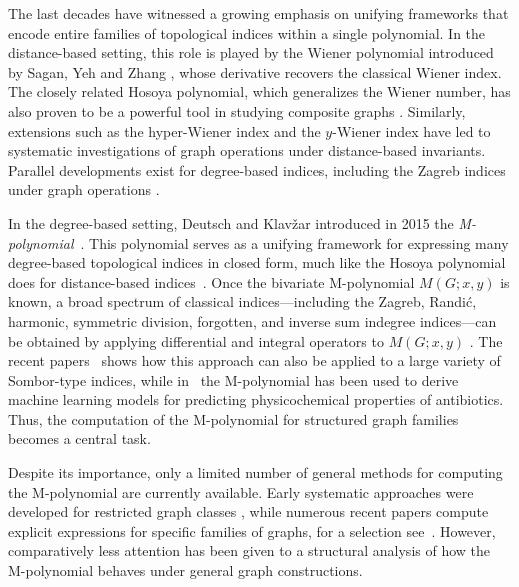 \documentclass[letterpaper,12pt]{article}
\begin{document}
The last decades have witnessed a growing emphasis on unifying frameworks that
encode entire families of topological indices within a single polynomial.
In the distance-based setting, this role is played by the Wiener polynomial
introduced by Sagan, Yeh and Zhang \cite{SaganWienerpolynomial1996},
whose derivative recovers the classical Wiener index.
The closely related Hosoya polynomial, which generalizes the Wiener number,
has also proven to be a powerful tool in studying composite graphs
\cite{STEVANOVIC2001237}.
Similarly, extensions such as the hyper-Wiener index
\cite{KHALIFEH20081402} and the $y$-Wiener index
\cite{HAMZEH20111099} have led to systematic investigations of
graph operations under distance-based invariants.
Parallel developments exist for degree-based indices,
including the Zagreb indices under graph operations
\cite{KHALIFEH2009804}. 

In the degree-based setting, Deutsch and Klavžar introduced in 2015 the
\emph{M-polynomial}~\cite{EmericMploy}. 
This polynomial serves as a unifying framework for expressing many
degree-based topological indices in closed form, much like the Hosoya
polynomial does for distance-based indices~\cite{deutsch2019m}.
Once the bivariate M-polynomial $M(G;x,y)$ is known, a broad spectrum of classical indices---including
the Zagreb, Randi\'{c}, harmonic, symmetric division, forgotten, and inverse sum
indegree indices---can be obtained by applying differential and integral
operators to $M(G;x,y)$ \cite{EmericMploy}. The recent papers~\cite{das2025closed, kumar2025novel} shows how this approach can also be applied to a large variety of Sombor-type indices, while in~\cite{li-2025} the M-polynomial has been used to derive machine learning models for predicting physicochemical properties of antibiotics. Thus, the computation of the M-polynomial for structured graph families becomes a central task.

Despite its importance, only a limited number of general methods for
computing the M-polynomial are currently available.
Early systematic approaches were developed for restricted graph classes
\cite{deutsch2019m,deutsch2023compute},
while numerous recent papers compute explicit expressions for specific
families of graphs, for a selection see~\cite{akhbari2025developing, abubakar2025exploring, 
ishfaq2024topological, CHAMUA2022, kwun2017m, pradeepa-2025}.
However, comparatively less attention has been given to a structural
analysis of how the M-polynomial behaves under general graph
constructions.
\end{document}
